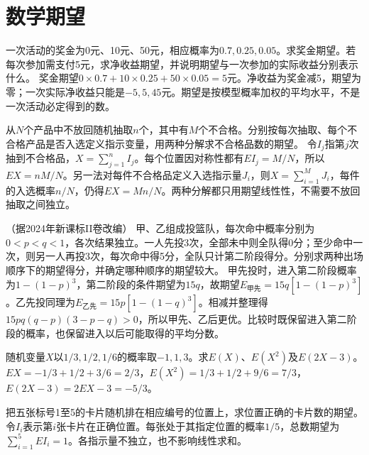 \par\addvspace{12pt}

\section{数学期望}

一次活动的奖金为0元、10元、50元，相应概率为\(0.7,0.25,0.05\)。求奖金期望。若每次参加需支付5元，求净收益期望，并说明期望与一次参加的实际收益分别表示什么。
\solutionanswer
奖金期望\(0\times0.7+10\times0.25+50\times0.05=5\)元。净收益为奖金减5，期望为零；一次实际净收益只能是\(-5,5,45\)元。期望是按模型概率加权的平均水平，不是一次活动必定得到的数。


从\(N\)个产品中不放回随机抽取\(n\)个，其中有\(M\)个不合格。分别按每次抽取、每个不合格产品是否入选定义指示变量，用两种分解求不合格品数的期望。
\solutionanswer
令\(I_j\)指第\(j\)次抽到不合格品，\(X=\sum_{j=1}^nI_j\)。每个位置因对称性都有\(EI_j=M/N\)，所以\(EX=nM/N\)。另一法对每件不合格品定义入选指示量\(J_i\)，则\(X=\sum_{i=1}^MJ_i\)，每件的入选概率\(n/N\)，仍得\(EX=Mn/N\)。两种分解都只用期望线性性，不需要不放回抽取之间独立。


（据2024年新课标II卷改编）
甲、乙组成投篮队，每次命中概率分别为\(0<p<q<1\)，各次结果独立。一人先投3次，全部未中则全队得0分；至少命中一次，则另一人再投3次，每次命中得5分，全队只计第二阶段得分。分别求两种出场顺序下的期望得分，并确定哪种顺序的期望较大。
\solutionanswer
甲先投时，进入第二阶段概率为\(1-(1-p)^3\)，第二阶段的条件期望为\(15q\)，故期望\(E_{\text{甲先}}=15q[1-(1-p)^3]\)。乙先投同理为\(E_{\text{乙先}}=15p[1-(1-q)^3]\)。相减并整理得\(15pq(q-p)(3-p-q)>0\)，所以甲先、乙后更优。比较时既保留进入第二阶段的概率，也保留进入以后可能取得的平均分数。


随机变量\(X\)以\(1/3,1/2,1/6\)的概率取\(-1,1,3\)。求\(E(X)\)、\(E(X^2)\)及\(E(2X-3)\)。
\solutionanswer
\(EX=-1/3+1/2+3/6=2/3\)，\(E(X^2)=1/3+1/2+9/6=7/3\)，\(E(2X-3)=2EX-3=-5/3\)。


把五张标号1至5的卡片随机排在相应编号的位置上，求位置正确的卡片数的期望。
\solutionanswer
令\(I_i\)表示第\(i\)张卡片在正确位置。每张处于其指定位置的概率\(1/5\)，总数期望为\(\sum_{i=1}^5EI_i=1\)。各指示量不独立，也不影响线性求和。


